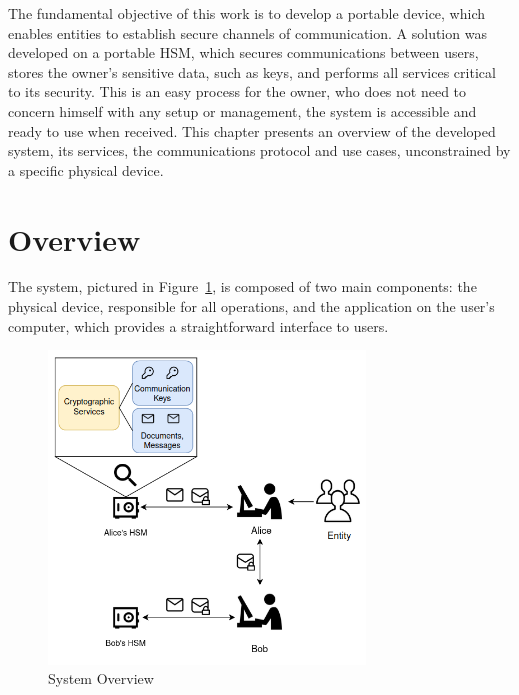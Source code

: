 \cleardoublepage
\label{chap:arch}

The fundamental objective of this work is to develop a portable device,  which enables entities to establish secure channels of communication.
A solution was developed on a portable HSM, which secures communications between users, stores the owner's sensitive data, such as keys, and performs all services critical to its security. This is an easy process for the owner, who does not need to concern himself with any setup or management, the system is accessible and ready to use when received.
This chapter presents an overview of the developed system, its services, the communications protocol and use cases, unconstrained by a specific physical device.

\section{Overview}\label{chap:arch:overview}

The system, pictured in Figure~\ref{fig:overview}, is composed of two main components: the physical device, responsible for all operations, and the application on the user's computer, which provides a straightforward interface to users.

\begin{figure}[h]
    \centering
    \includegraphics[width=0.75\textwidth]{./Images/overview2.png}
    \caption{System Overview}
    \label{fig:overview}
\end{figure}


